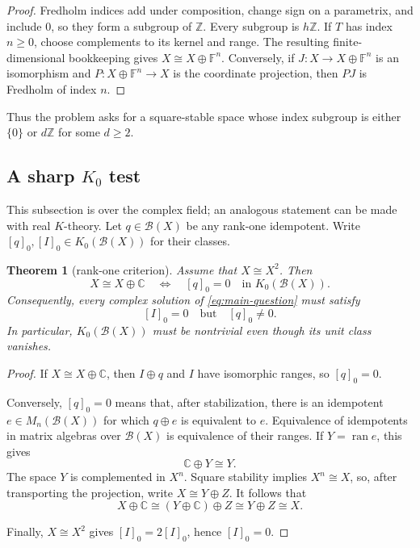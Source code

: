 \documentclass[11pt]{article}
\newtheorem{theorem}{Theorem}[section]
\theoremstyle{definition}
\theoremstyle{remark}
\newcommand{\F}{\mathbb F}
\newcommand{\Z}{\mathbb Z}
\newcommand{\B}{\mathcal B}
\begin{document}
\begin{proof}
Fredholm indices add under composition, change sign on a parametrix, and include
$0$, so they form a subgroup of $\Z$.  Every subgroup is $h\Z$.  If $T$ has
index $n\ge0$, choose complements to its kernel and range.  The resulting
finite-dimensional bookkeeping gives $X\cong X\oplus\F^n$.  Conversely, if
$J:X\to X\oplus\F^n$ is an isomorphism and $P:X\oplus\F^n\to X$ is the
coordinate projection, then $PJ$ is Fredholm of index $n$.
\end{proof}

Thus the problem asks for a square-stable space whose index subgroup is either
$\{0\}$ or $d\Z$ for some $d\ge2$.

\subsection{A sharp $K_0$ test}

This subsection is over the complex field; an analogous statement can be made
with real $K$-theory.  Let $q\in\B(X)$ be any rank-one idempotent.  Write
$[q]_0,[I]_0\in K_0(\B(X))$ for their classes.

\begin{theorem}[rank-one criterion]\label{thm:k0-criterion}
Assume that $X\cong X^2$.  Then
\[
 X\cong X\oplus\mathbb C
 \quad\Longleftrightarrow\quad
 [q]_0=0\quad\text{in }K_0(\B(X)).
\]
Consequently, every complex solution of \eqref{eq:main-question} must satisfy
\[
 [I]_0=0\quad\text{but}\quad[q]_0\ne0.
\]
In particular, $K_0(\B(X))$ must be nontrivial even though its unit class
vanishes.
\end{theorem}

\begin{proof}
If $X\cong X\oplus\mathbb C$, then $I\oplus q$ and $I$ have isomorphic ranges,
so $[q]_0=0$.

Conversely, $[q]_0=0$ means that, after stabilization, there is an
idempotent $e\in M_n(\B(X))$ for which $q\oplus e$ is equivalent to $e$.
Equivalence of idempotents in matrix algebras over $\B(X)$ is equivalence of
their ranges.  If $Y=\operatorname{ran}e$, this gives
\[
 \mathbb C\oplus Y\cong Y.
\]
The space $Y$ is complemented in $X^n$.  Square stability implies
$X^n\cong X$, so, after transporting the projection, write $X\cong Y\oplus Z$.
It follows that
\[
 X\oplus\mathbb C\cong (Y\oplus\mathbb C)\oplus Z
 \cong Y\oplus Z\cong X.
\]

Finally, $X\cong X^2$ gives $[I]_0=2[I]_0$, hence $[I]_0=0$.
\end{proof}
\end{document}
